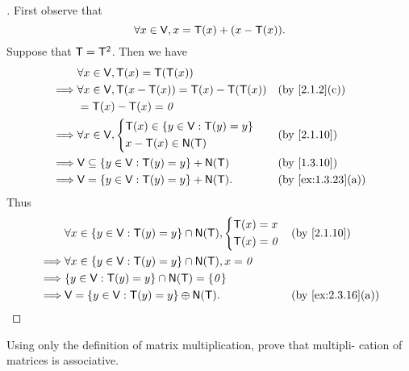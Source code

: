 \begin{proof}[]
	First observe that
	\[
		\forall x \in \mathsf{V}, x = \mathsf{T}(x) + (x - \mathsf{T}(x)).
	\]
	Suppose that \(\mathsf{T} = \mathsf{T}^2\).
	Then we have
	\begin{align*}
		         & \forall x \in \V, \T(x) = \T(\T(x))                                        \\
		\implies & \forall x \in \V, \T(x - \T(x)) = \T(x) - \T(\T(x)) &  & \by{2.1.2}[c]     \\
		         & = \T(x) - \T(x) = \zv                                                      \\
		\implies & \forall x \in \V, \begin{dcases}
			                             \T(x) \in \set{y \in \V : \T(y) = y} \\
			                             x - \T(x) \in \ns{\T}
		                             \end{dcases}             &  & \by{2.1.10}                \\
		\implies & \V \subseteq \set{y \in \V : \T(y) = y} + \ns{\T}   &  & \by{1.3.10}       \\
		\implies & \V = \set{y \in \V : \T(y) = y} + \ns{\T}.          &  & \by{ex:1.3.23}[a]
	\end{align*}
	Thus
	\begin{align*}
		         & \forall x \in \set{y \in \V : \T(y) = y} \cap \ns{\T}, \begin{dcases}
			                                                                  \T(x) = x \\
			                                                                  \T(x) = \zv
		                                                                  \end{dcases} &  & \by{2.1.10}         \\
		\implies & \forall x \in \set{y \in \V : \T(y) = y} \cap \ns{\T}, x = \zv                               \\
		\implies & \set{y \in \V : \T(y) = y} \cap \ns{\T} = \set{\zv}                                          \\
		\implies & \V = \set{y \in \V : \T(y) = y} \oplus \ns{\T}.                       &  & \by{ex:2.3.16}[a]
	\end{align*}
\end{proof}

\begin{ex}\label{ex:2.3.18}
	Using only the definition of matrix multiplication, prove that multipli- cation of matrices is associative.
\end{ex}

